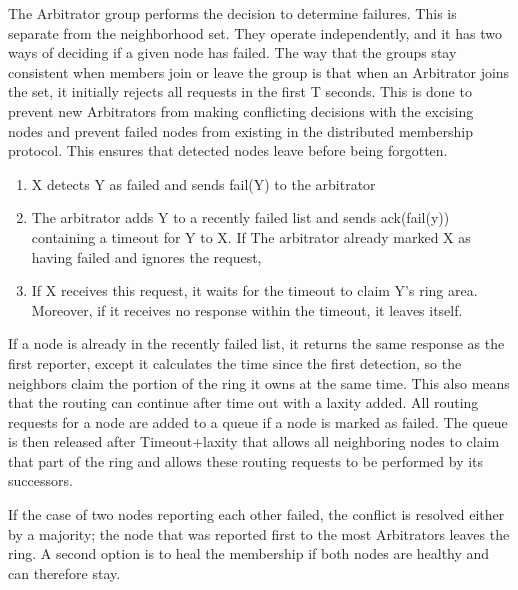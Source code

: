 \documentclass[a4paper,10pt,titlepage]{report}
\begin{document}
    The Arbitrator group performs the decision to determine failures. This is separate from the neighborhood set. They operate independently, and it has two ways of deciding if a given node has failed. The way that the groups stay consistent when members join or leave the group is that when an Arbitrator joins the set, it initially rejects all requests in the first T seconds. This is done to prevent new Arbitrators from making conflicting decisions with the excising nodes and prevent failed nodes from existing in the distributed membership protocol. This ensures that detected nodes leave before being forgotten.\\
    \vspace{5mm}

    \begin{enumerate}
        \item X detects Y as failed and sends fail(Y) to the arbitrator
        \item The arbitrator adds Y to a recently failed list and sends ack(fail(y)) containing a timeout for Y to X. If The arbitrator already marked X as having failed and ignores the request,
        \item If X receives this request, it waits for the timeout to claim Y's ring area. Moreover, if it receives no response within the timeout, it leaves itself.
    \end{enumerate}

    If a node is already in the recently failed list, it returns the same response as the first reporter, except it calculates the time since the first detection, so the neighbors claim the portion of the ring it owns at the same time. This also means that the routing can continue after time out with a laxity added. All routing requests for a node are added to a queue if a node is marked as failed. The queue is then released after Timeout+laxity that allows all neighboring nodes to claim that part of the ring and allows these routing requests to be performed by its successors.\\
    \vspace{5mm}

    If the case of two nodes reporting each other failed, the conflict is resolved either by a majority; the node that was reported first to the most Arbitrators leaves the ring. A second option is to heal the membership if both nodes are healthy and can therefore stay. \\   \vspace{5mm}
    
\end{document}
